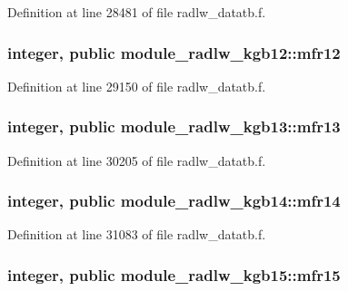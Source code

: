 Definition at line 28481 of file radlw\+\_\+datatb.\+f.

\subsubsection[{\texorpdfstring{mfr12}{mfr12}}]{\setlength{\rightskip}{0pt plus 5cm}integer, public module\+\_\+radlw\+\_\+kgb12\+::mfr12}\hypertarget{group__module__radlw__main_gacd751a2e48d0286e3d25a9b658a8367a}{}\label{group__module__radlw__main_gacd751a2e48d0286e3d25a9b658a8367a}


Definition at line 29150 of file radlw\+\_\+datatb.\+f.

\subsubsection[{\texorpdfstring{mfr13}{mfr13}}]{\setlength{\rightskip}{0pt plus 5cm}integer, public module\+\_\+radlw\+\_\+kgb13\+::mfr13}\hypertarget{group__module__radlw__main_ga158782c955af9f50aaefea2d49af97ce}{}\label{group__module__radlw__main_ga158782c955af9f50aaefea2d49af97ce}


Definition at line 30205 of file radlw\+\_\+datatb.\+f.

\subsubsection[{\texorpdfstring{mfr14}{mfr14}}]{\setlength{\rightskip}{0pt plus 5cm}integer, public module\+\_\+radlw\+\_\+kgb14\+::mfr14}\hypertarget{group__module__radlw__main_ga52354badbce95c005b19bd5a443fd488}{}\label{group__module__radlw__main_ga52354badbce95c005b19bd5a443fd488}


Definition at line 31083 of file radlw\+\_\+datatb.\+f.

\subsubsection[{\texorpdfstring{mfr15}{mfr15}}]{\setlength{\rightskip}{0pt plus 5cm}integer, public module\+\_\+radlw\+\_\+kgb15\+::mfr15}\hypertarget{group__module__radlw__main_gad4d78009d0c7ffa27dbb228e68307675}{}\label{group__module__radlw__main_gad4d78009d0c7ffa27dbb228e68307675}



